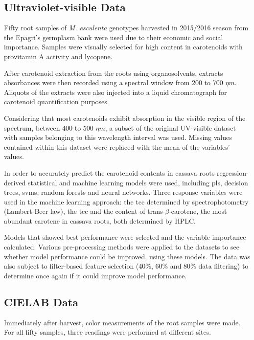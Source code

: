\subsection{Ultraviolet-visible Data}

Fifty root samples of \textit{M. esculenta} genotypes harvested in 2015/2016 season from the Epagri's germplasm bank were used due to their economic and social importance. Samples were visually selected for high content in carotenoids with provitamin A activity and lycopene. 

After carotenoid extraction from the roots using organosolvents, extracts absorbances were then recorded using a spectral window from 200 to 700 $\eta m$. Aliquots of the extracts were also injected into a liquid chromatograph for carotenoid quantification purposes. 

Considering that most carotenoids exhibit absorption in the visible region of
the spectrum, between 400 to 500 $\eta m$, a subset of the original UV-visible
dataset with samples belonging to this wavelength interval was used. Missing values contained within this dataset were replaced with the mean of the variables' values.

In order to accurately predict the carotenoid contents in cassava roots regression-derived statistical and machine learning models were used, including \gls{pls}, decision trees, \gls{svm}s, random forests and neural networks. Three response variables were used in the machine learning approach: the \gls{tcc} determined by spectrophotometry (Lambert-Beer law), the \gls{tcc} and the content of trans-$\beta$-carotene, the most abundant carotene in cassava roots, both determined by HPLC.

Models that showed best performance were selected and the variable importance calculated. Various pre-processing methods were applied to the datasets to see whether model performance could be improved, using these models. The data was also subject to filter-based feature selection (40\%, 60\% and 80\% data filtering) to determine once again if it could improve model performance.


\subsection{CIELAB Data}

Immediately after harvest, color measurements of the root samples were made. For all fifty samples, three readings were performed at different sites.


